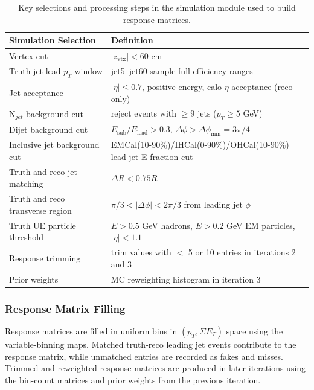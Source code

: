 \begin{table}[t]
    \centering
    \small
    \begin{tabular}{ll}
        \hline
        Simulation Selection & Definition \\
        \hline
        Vertex cut & $|z_{\mathrm{vtx}}|<60$ cm \\
        Truth jet lead $p_{T}$ window & jet5--jet60 sample full efficiency ranges \\
        Jet acceptance & $|\eta| \le 0.7$, positive energy, calo-$\eta$ acceptance (reco only) \\
        N$_{jet}$ background cut & reject events with $\ge 9$ jets ($p_{T}\ge 5$ GeV) \\
        Dijet background cut & $E_{\mathrm{sub}}/E_{\mathrm{lead}}>0.3$, $\Delta\phi>\Delta\phi_{\mathrm{min}} = 3\pi /4$ \\
        Inclusive jet background cut & EMCal(10-90\%)/IHCal(0-90\%)/OHCal(10-90\%) lead jet E-fraction cut \\
        Truth and reco jet matching & $\Delta R < 0.75R$ \\
        Truth and reco transverse region & $\pi/3 < |\Delta\phi| < 2\pi/3$ from leading jet $\phi$ \\
        Truth UE particle threshold & $E>0.5$ GeV hadrons, $E>0.2$ GeV EM particles, $|\eta|<1.1$ \\
        Response trimming & trim values with $<$ 5 or 10 entries in iterations 2 and 3 \\
        Prior weights & MC reweighting histogram in iteration 3 \\
        \hline
    \end{tabular}
    \caption{Key selections and processing steps in the simulation module used to build response matrices.}
    \label{tab:sim_unfold_processing}
\end{table}

\subsubsection{Response Matrix Filling}

Response matrices are filled in uniform bins in $(p_{T}, \Sigma E_{T})$ space using the variable-binning maps. 
Matched truth-reco leading jet events contribute to the response matrix, while unmatched entries are recorded as fakes and misses. 
Trimmed and reweighted response matrices are produced in later iterations using the bin-count matrices and prior weights from the previous iteration. 

